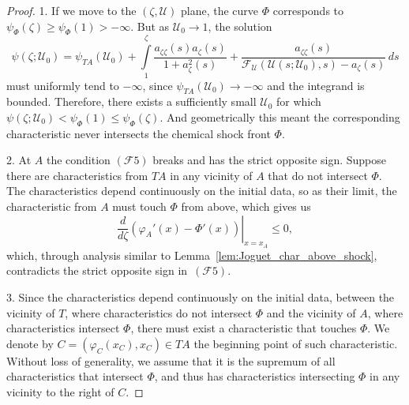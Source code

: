 \documentclass[12pt]{article}
\theoremstyle{definition}
\begin{document}
\begin{proof}
1. If we move to the $(\zeta, \mathcal U)$ plane, the curve $\Phi$ corresponds to $\psi_\Phi(\zeta) \geqslant \psi_\Phi(1) > -\infty$. But as $\mathcal U_0 \to 1$, the solution 
\[
\psi(\zeta; \mathcal U_0) = \psi_{TA}(\mathcal U_0) + \int\limits_{1}^\zeta \frac{a_{\zeta\zeta}(s)a_\zeta(s)}{1 + a_\zeta^2(s)} + \frac{a_{\zeta\zeta}(s)}{\mathcal F_{\mathcal U}(\mathcal U(s; \mathcal U_0), s) - a_\zeta(s)} \, ds
\]
must uniformly tend to $-\infty$, since $\psi_{TA}(\mathcal U_0) \to -\infty$ and the integrand is bounded. Therefore, there exists a sufficiently small $\mathcal U_0$ for which $\psi(\zeta; \mathcal U_0) < \psi_\Phi(1) \leqslant\psi_\Phi(\zeta)$. And geometrically this meant the corresponding characteristic never intersects the chemical shock front $\Phi$. 

2. At $A$ the condition $(\mathcal F 5)$ breaks and has the strict opposite sign. Suppose there are characteristics from $TA$ in any vicinity of $A$
that do not intersect $\Phi$. The characteristics depend continuously on the initial data, so as their limit, the characteristic from $A$ must touch $\Phi$ from above, which gives us
\[
\left.\dfrac{d}{d\zeta}(\varphi_A'(x) - \Phi'(x))\right|_{x=x_A} \leqslant 0,
\]
which, through analysis similar to Lemma~\ref{lem:Joguet_char_above_shock}, contradicts the strict opposite sign in~$(\mathcal F 5)$. 

3. Since the characteristics depend continuously on the initial data, between the vicinity of $T$, where characteristics do not intersect $\Phi$ and the vicinity of $A$, where characteristics intersect $\Phi$, there must exist a characteristic that touches $\Phi$. We denote by $C = (\varphi_C(x_C), x_C)\in TA$ the beginning point of such characteristic. Without loss of generality, we assume that it is the supremum of all characteristics that intersect $\Phi$, and thus has characteristics intersecting $\Phi$ in any vicinity to the right of $C$. 


\end{proof}
\end{document}
